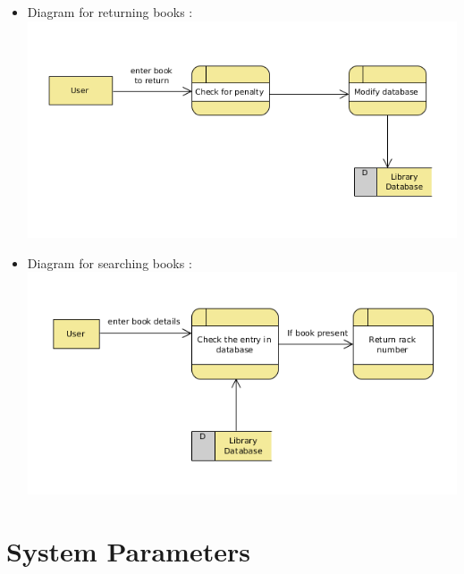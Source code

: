 \documentclass[a4paper]{article}
\begin{document}
\begin{itemize}
\begin{itemize}
\item Diagram for returning books : \\ \includegraphics[scale=0.5]{images/dfdDiagReturnBook.png}\\
\item Diagram for searching books : \\ \includegraphics[scale=0.5]{images/dfdDiagSearch.png}\\
\end{itemize}
\end{itemize}



\section{System Parameters}
\end{document}
